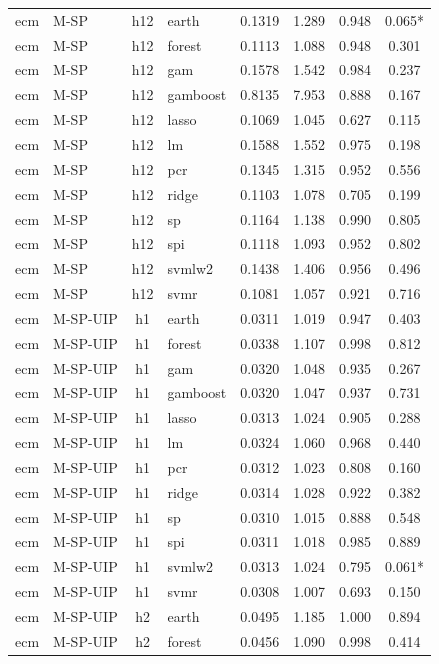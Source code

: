 \begin{ThreePartTable}
\begin{longtable}[t]{llclcccc}
\addlinespace
ecm & M-SP & h12 & earth & 0.1319 & 1.289 & 0.948 & 0.065*\\
ecm & M-SP & h12 & forest & 0.1113 & 1.088 & 0.948 & 0.301\\
ecm & M-SP & h12 & gam & 0.1578 & 1.542 & 0.984 & 0.237\\
ecm & M-SP & h12 & gamboost & 0.8135 & 7.953 & 0.888 & 0.167\\
ecm & M-SP & h12 & lasso & 0.1069 & 1.045 & 0.627 & 0.115\\
ecm & M-SP & h12 & lm & 0.1588 & 1.552 & 0.975 & 0.198\\
ecm & M-SP & h12 & pcr & 0.1345 & 1.315 & 0.952 & 0.556\\
ecm & M-SP & h12 & ridge & 0.1103 & 1.078 & 0.705 & 0.199\\
ecm & M-SP & h12 & sp & 0.1164 & 1.138 & 0.990 & 0.805\\
ecm & M-SP & h12 & spi & 0.1118 & 1.093 & 0.952 & 0.802\\
ecm & M-SP & h12 & svmlw2 & 0.1438 & 1.406 & 0.956 & 0.496\\
ecm & M-SP & h12 & svmr & 0.1081 & 1.057 & 0.921 & 0.716\\
\addlinespace
ecm & M-SP-UIP & h1 & earth & 0.0311 & 1.019 & 0.947 & 0.403\\
ecm & M-SP-UIP & h1 & forest & 0.0338 & 1.107 & 0.998 & 0.812\\
ecm & M-SP-UIP & h1 & gam & 0.0320 & 1.048 & 0.935 & 0.267\\
ecm & M-SP-UIP & h1 & gamboost & 0.0320 & 1.047 & 0.937 & 0.731\\
ecm & M-SP-UIP & h1 & lasso & 0.0313 & 1.024 & 0.905 & 0.288\\
ecm & M-SP-UIP & h1 & lm & 0.0324 & 1.060 & 0.968 & 0.440\\
ecm & M-SP-UIP & h1 & pcr & 0.0312 & 1.023 & 0.808 & 0.160\\
ecm & M-SP-UIP & h1 & ridge & 0.0314 & 1.028 & 0.922 & 0.382\\
ecm & M-SP-UIP & h1 & sp & 0.0310 & 1.015 & 0.888 & 0.548\\
ecm & M-SP-UIP & h1 & spi & 0.0311 & 1.018 & 0.985 & 0.889\\
ecm & M-SP-UIP & h1 & svmlw2 & 0.0313 & 1.024 & 0.795 & 0.061*\\
ecm & M-SP-UIP & h1 & svmr & 0.0308 & 1.007 & 0.693 & 0.150\\
\addlinespace
ecm & M-SP-UIP & h2 & earth & 0.0495 & 1.185 & 1.000 & 0.894\\
ecm & M-SP-UIP & h2 & forest & 0.0456 & 1.090 & 0.998 & 0.414\\

\end{longtable}
\end{ThreePartTable}
